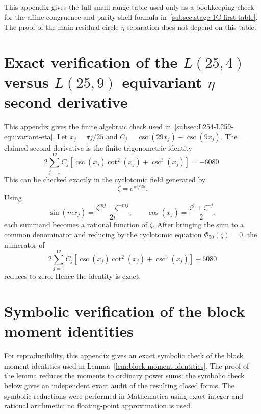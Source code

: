 \documentclass{article}
\theoremstyle{definition}
\numberwithin{equation}{section}
\begin{document}
This appendix gives the full small-range table used only as a bookkeeping check for the affine congruence and parity-shell formula in~\autoref{subsec:stage-1C-first-table}.  The proof of the main residual-circle $\eta$ separation does not depend on this table.

\FloatBarrier

\section{Exact verification of the \texorpdfstring{$L(25,4)$ versus $L(25,9)$}{L(25,4) versus L(25,9)} equivariant $\eta$ second derivative}
\label{app:L25-eta-second-derivative}

This appendix gives the finite algebraic check used in~\autoref{subsec:L254-L259-equivariant-eta}.  Let $x_j=\pi j/25$ and $C_j=\csc(29x_j)-\csc(9x_j)$.  The claimed second derivative is the finite trigonometric identity
\begin{equation}
2\sum_{j=1}^{12}
C_j
\left[
\csc(x_j)\cot^2(x_j)+\csc^3(x_j)
\right]
=
-6080.
\end{equation}
This can be checked exactly in the cyclotomic field generated by
\begin{equation}
\zeta=e^{\pi i/25}.
\end{equation}
Using
\begin{equation}
\sin(mx_j)=\frac{\zeta^{mj}-\zeta^{-mj}}{2i},
\qquad
\cos(x_j)=\frac{\zeta^{j}+\zeta^{-j}}{2},
\end{equation}
each summand becomes a rational function of $\zeta$.  After bringing the sum to a common denominator and reducing by the cyclotomic equation $\Phi_{50}(\zeta)=0$, the numerator of
\begin{equation}
2\sum_{j=1}^{12}
C_j
\left[
\csc(x_j)\cot^2(x_j)+\csc^3(x_j)
\right]
+6080
\end{equation}
reduces to zero.  Hence the identity is exact.


\section{Symbolic verification of the block moment identities}
\label{app:block-moment-verification}

For reproducibility, this appendix gives an exact symbolic check of the block moment identities used in Lemma~\ref{lem:block-moment-identities}.  The proof of the lemma reduces the moments to ordinary power sums; the symbolic check below gives an independent exact audit of the resulting closed forms.  The symbolic reductions were performed in Mathematica using exact integer and rational arithmetic; no floating-point approximation is used.
\end{document}
